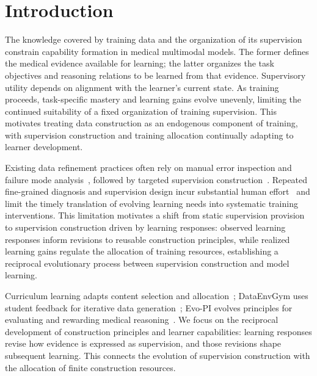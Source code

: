 \section{Introduction}
\label{sec:intro}

The knowledge covered by training data and the organization of its supervision constrain capability formation in medical multimodal models. The former defines the medical evidence available for learning; the latter organizes the task objectives and reasoning relations to be learned from that evidence. Supervisory utility depends on alignment with the learner's current state. As training proceeds, task-specific mastery and learning gains evolve unevenly, limiting the continued suitability of a fixed organization of training supervision. This motivates treating data construction as an endogenous component of training, with supervision construction and training allocation continually adapting to learner development.

Existing data refinement practices often rely on manual error inspection and failure mode analysis~\citep{wu2019errudite}, followed by targeted supervision construction~\citep{khan2025dataenvgym}. Repeated fine-grained diagnosis and supervision design incur substantial human effort~\citep{ribeiro2022adaptive} and limit the timely translation of evolving learning needs into systematic training interventions. This limitation motivates a shift from static supervision provision to supervision construction driven by learning responses: observed learning responses inform revisions to reusable construction principles, while realized learning gains regulate the allocation of training resources, establishing a reciprocal evolutionary process between supervision construction and model learning.

Curriculum learning adapts content selection and allocation~\citep{bengio2009curriculum,matiisen2017teacher}; DataEnvGym uses student feedback for iterative data generation~\citep{khan2025dataenvgym}; Evo-PI evolves principles for evaluating and rewarding medical reasoning~\citep{zheng2026evopi}. We focus on the reciprocal development of construction principles and learner capabilities: learning responses revise how evidence is expressed as supervision, and those revisions shape subsequent learning. This connects the evolution of supervision construction with the allocation of finite construction resources.

